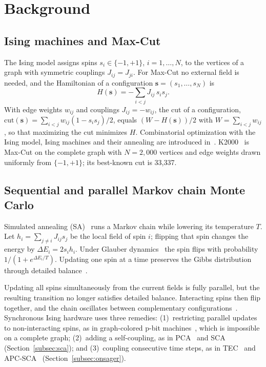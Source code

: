 \section{Background}\label{sec:background}

\subsection{Ising machines and Max-Cut}
The Ising model assigns spins $s_i\in\{-1,+1\}$, $i=1,\dots,N$, to the vertices of a graph with symmetric couplings $J_{ij}=J_{ji}$. For Max-Cut no external field is needed, and the Hamiltonian of a configuration $\mathbf{s}=(s_1,\dots,s_N)$ is
\begin{equation}
H(\mathbf{s}) = -\sum_{i<j} J_{ij}\, s_i s_j .
\label{eq:ising}
\end{equation}
With edge weights $w_{ij}$ and couplings $J_{ij}=-w_{ij}$, the cut of a configuration, $\mathrm{cut}(\mathbf{s})=\sum_{i<j}w_{ij}(1-s_is_j)/2$, equals $(W-H(\mathbf{s}))/2$ with $W=\sum_{i<j}w_{ij}$, so that maximizing the cut minimizes $H$. Combinatorial optimization with the Ising model, Ising machines and their annealing are introduced in~\cite{hong2026snowball}. K2000~\cite{doi:10.1126/science.aah4243} is Max-Cut on the complete graph with $N=2{,}000$ vertices and edge weights drawn uniformly from $\{-1,+1\}$; its best-known cut is 33{,}337.

\subsection{Sequential and parallel Markov chain Monte Carlo}\label{subsec:mcmc}
Simulated annealing (SA)~\cite{kirkpatrick1983optimization} runs a Markov chain while lowering its temperature $T$. Let $h_i=\sum_{j\neq i}J_{ij}s_j$ be the local field of spin $i$; flipping that spin changes the energy by $\Delta E_i=2s_ih_i$. Under Glauber dynamics~\cite{glauber1963time} the spin flips with probability $1/(1+e^{\Delta E_i/T})$. Updating one spin at a time preserves the Gibbs distribution through detailed balance~\cite{robert1999monte}.

Updating all spins simultaneously from the current fields is fully parallel, but the resulting transition no longer satisfies detailed balance. Interacting spins then flip together, and the chain oscillates between complementary configurations~\cite{heermann1990parallelization}. Synchronous Ising hardware uses three remedies: (1)~restricting parallel updates to non-interacting spins, as in graph-colored p-bit machines~\cite{10185207}, which is impossible on a complete graph; (2)~adding a self-coupling, as in PCA~\cite{daipra2012sampling} and SCA~\cite{9062965} (Section~\ref{subsec:sca}); and (3)~coupling consecutive time steps, as in TEC~\cite{du2026tec} and APC-SCA~\cite{okonogi2023apc} (Section~\ref{subsec:onsager}).


